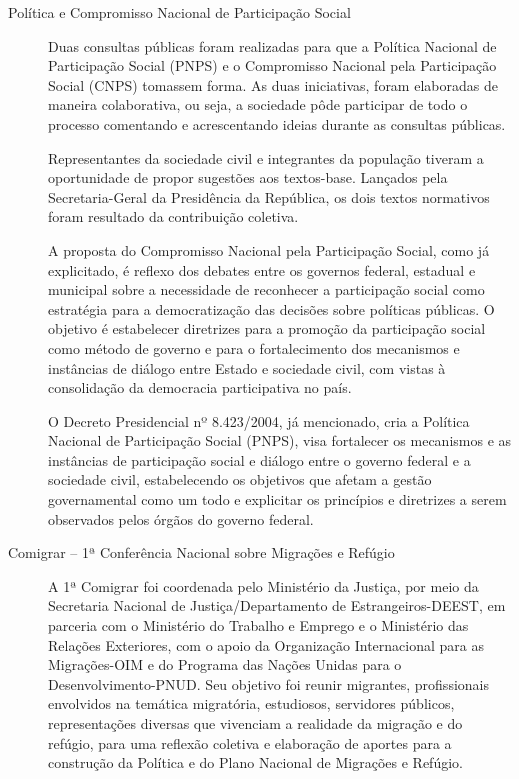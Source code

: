 \documentclass{article}
\begin{document}
\begin{description}

  \item [Política e Compromisso Nacional de Participação Social]

  Duas consultas públicas foram realizadas para que a Política Nacional de
  Participação Social (PNPS) e o Compromisso Nacional pela Participação Social
  (CNPS) tomassem forma. As duas iniciativas, foram elaboradas de maneira
  colaborativa, ou seja, a sociedade pôde participar de todo o processo
  comentando e acrescentando ideias durante as consultas públicas.

  Representantes da sociedade civil e integrantes da população tiveram a
  oportunidade de propor sugestões aos textos-base. Lançados pela
  Secretaria-Geral da Presidência da República, os dois textos normativos foram
  resultado da contribuição coletiva.

  A proposta do Compromisso Nacional pela Participação Social, como já
  explicitado, é reflexo dos debates entre os governos federal, estadual e
  municipal sobre a necessidade de reconhecer a participação social como
  estratégia para a democratização das decisões sobre políticas públicas. O
  objetivo é estabelecer diretrizes para a promoção da participação social como
  método de governo e para o fortalecimento dos mecanismos e instâncias de
  diálogo entre Estado e sociedade civil, com vistas à consolidação da
  democracia participativa no país.

  O Decreto Presidencial nº 8.423/2004, já mencionado, cria a Política Nacional
  de Participação Social (PNPS), visa fortalecer os mecanismos e as instâncias
  de participação social e diálogo entre o governo federal e a sociedade civil,
  estabelecendo os objetivos que afetam a gestão governamental como um todo e
  explicitar os princípios e diretrizes a serem observados pelos órgãos do
  governo federal.

  \item [Comigrar – 1ª Conferência Nacional sobre Migrações e Refúgio]

  A 1ª Comigrar foi coordenada pelo Ministério da Justiça, por meio da
  Secretaria Nacional de Justiça/Departamento de Estrangeiros-DEEST, em
  parceria com o Ministério do Trabalho e Emprego e o Ministério das Relações
  Exteriores, com o apoio da Organização Internacional para as Migrações-OIM e
  do Programa das Nações Unidas para o Desenvolvimento-PNUD. Seu objetivo foi
  reunir migrantes, profissionais envolvidos na temática migratória,
  estudiosos, servidores públicos, representações diversas que vivenciam a
  realidade da migração e do refúgio, para uma reflexão coletiva e elaboração
  de aportes para a construção da Política e do Plano Nacional de Migrações e
  Refúgio.


\end{description}
\end{document}
